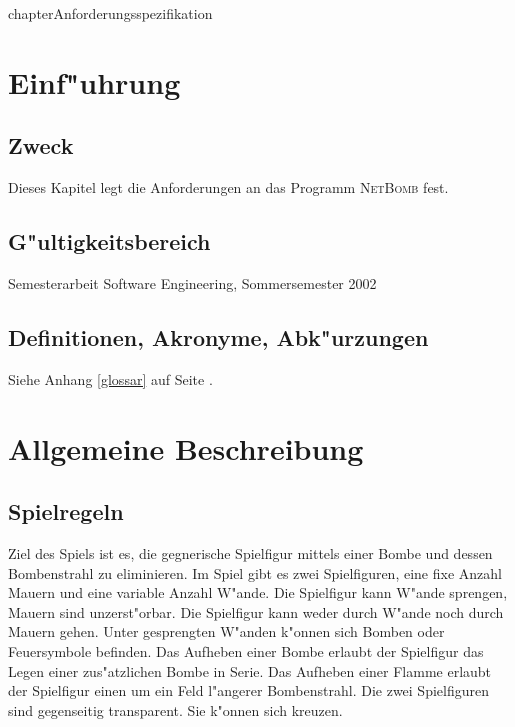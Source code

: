 chapter{Anforderungsspezifikation}

\section{Einf"uhrung}

\subsection{Zweck}
Dieses Kapitel legt die Anforderungen an das Programm \textsc{NetBomb} fest.

\subsection{G"ultigkeitsbereich}
Semesterarbeit Software Engineering, Sommersemester 2002

\subsection{Definitionen, Akronyme, Abk"urzungen}
Siehe Anhang \ref{glossar} auf Seite \pageref{glossar}.

\section{Allgemeine Beschreibung}
\subsection{Spielregeln}

Ziel des Spiels ist es, die gegnerische Spielfigur mittels einer Bombe und dessen Bombenstrahl zu eliminieren.
Im Spiel gibt es zwei Spielfiguren, eine fixe Anzahl Mauern und eine variable Anzahl W"ande.
Die Spielfigur kann W"ande sprengen, Mauern sind unzerst"orbar.
Die Spielfigur kann weder durch W"ande noch durch Mauern gehen.
Unter gesprengten W"anden k"onnen sich Bomben oder Feuersymbole befinden. Das Aufheben einer Bombe erlaubt der Spielfigur
das Legen einer zus"atzlichen Bombe in Serie. Das Aufheben einer Flamme erlaubt der Spielfigur einen um ein Feld
l"angerer Bombenstrahl.
Die zwei Spielfiguren sind gegenseitig transparent. Sie k"onnen sich kreuzen.


